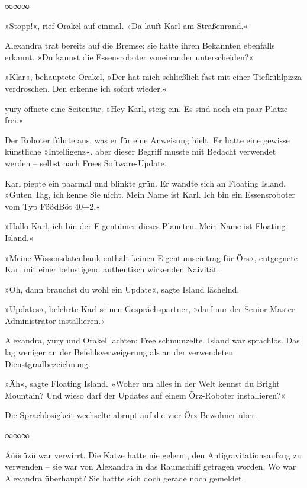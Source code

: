 \begin{center}
∞∞∞
\end{center}

»Stopp!«, rief Orakel auf einmal. »Da läuft Karl am Straßenrand.«

Alexandra trat bereits auf die Bremse; sie hatte ihren Bekannten ebenfalls erkannt. »Du kannst die Essensroboter voneinander unterscheiden?«

»Klar«, behauptete Orakel, »Der hat mich schließlich fast mit einer Tiefkühlpizza verdroschen. Den erkenne ich sofort wieder.«

yury öffnete eine Seitentür. »Hey Karl, steig ein. Es sind noch ein paar Plätze frei.«

Der Roboter führte aus, was er für eine Anweisung hielt. Er hatte eine gewisse künstliche »Intelligenz«, aber dieser Begriff musste mit Bedacht verwendet werden – selbst nach Frees Software-Update.

Karl piepte ein paarmal und blinkte grün. Er wandte sich an Floating Island. »Guten Tag, ich kenne Sie nicht. Mein Name ist Karl. Ich bin ein Essensroboter vom Typ FöödBöt 40+2.«

»Hallo Karl, ich bin der Eigentümer dieses Planeten. Mein Name ist Floating Island.«

»Meine Wissensdatenbank enthält keinen Eigentumseintrag für Örs«, entgegnete Karl mit einer belustigend authentisch wirkenden Naivität.

»Oh, dann brauchst du wohl ein Update«, sagte Island lächelnd.

»Updates«, belehrte Karl seinen Gesprächspartner, »darf nur der Senior Master Administrator installieren.«

Alexandra, yury und Orakel lachten; Free schmunzelte. Island war sprachlos. Das lag weniger an der Befehlsverweigerung als an der verwendeten Dienstgradbezeichnung.

»Äh«, sagte Floating Island. »Woher um alles in der Welt kennst du Bright Mountain? Und wieso darf der Updates auf einem Örz-Roboter installieren?«

Die Sprachlosigkeit wechselte abrupt auf die vier Örz-Bewohner über.

\begin{center}
∞∞∞
\end{center}

Äüörüzü war verwirrt. Die Katze hatte nie gelernt, den Antigravitationsaufzug zu verwenden – sie war von Alexandra in das Raumschiff getragen worden. Wo war Alexandra überhaupt? Sie hattte sich doch gerade noch gemeldet.

